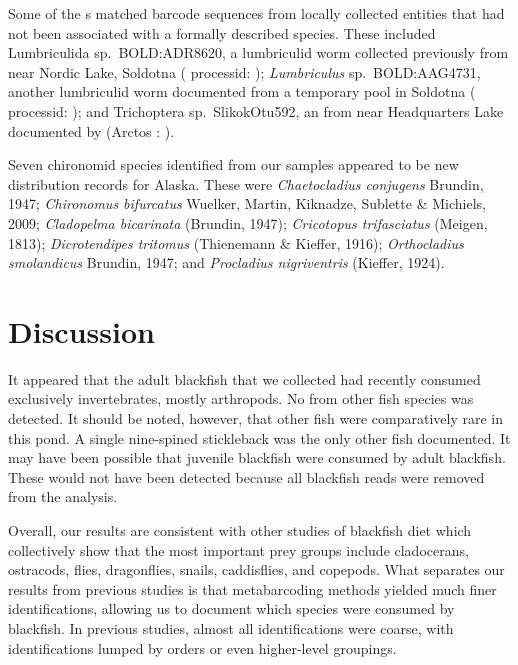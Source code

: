 \begin{multicols}{2} 

Some of the s matched  barcode sequences from locally collected entities that had not been associated with a formally described species. These included Lumbriculida sp.\ BOLD:ADR8620, a lumbriculid worm collected previously from near Nordic Lake, Soldotna ( processid: ); \textit{Lumbriculus} sp.\ BOLD:AAG4731, another lumbriculid worm documented from a temporary pool in Soldotna ( processid: ); and Trichoptera sp.\ SlikokOtu592, an  from near Headquarters Lake documented by \citet{Bowseretal2020} (Arctos : ).

Seven chironomid species identified from our samples appeared to be new distribution records for Alaska. These were 
\textit{Chaetocladius conjugens} Brundin, 1947; 
\textit{Chironomus bifurcatus} Wuelker, Martin, Kiknadze, Sublette \& Michiels, 2009; 
\textit{Cladopelma bicarinata} (Brundin, 1947);
\textit{Cricotopus trifasciatus} (Meigen, 1813);
\textit{Dicrotendipes tritomus} (Thienemann \& Kieffer, 1916);
\textit{Orthocladius smolandicus} Brundin, 1947; and
\textit{Procladius nigriventris} (Kieffer, 1924).

\section{Discussion}

It appeared that the adult blackfish that we collected had recently consumed exclusively invertebrates, mostly arthropods. No  from other fish species was detected. It should be noted, however, that other fish were comparatively rare in this pond. A single nine-spined stickleback was the only other fish documented. It may have been possible that juvenile blackfish were consumed by adult blackfish. These would not have been detected because all blackfish reads were removed from the analysis.

Overall, our results are consistent with other studies of blackfish diet \citep{OstdiekNardone1959, Chlupach1975, Gudkov1998, Eidam2015, Eidametal2016, Bowseretal2019} which collectively show that the most important prey groups
include cladocerans, ostracods, flies, dragonflies, snails, caddisflies,
and copepods. What separates our results from previous studies is that metabarcoding methods yielded much finer identifications, allowing us to document which species were consumed by blackfish. In previous studies, almost all identifications were coarse, with identifications lumped by orders or even higher-level groupings.


\end{multicols}
